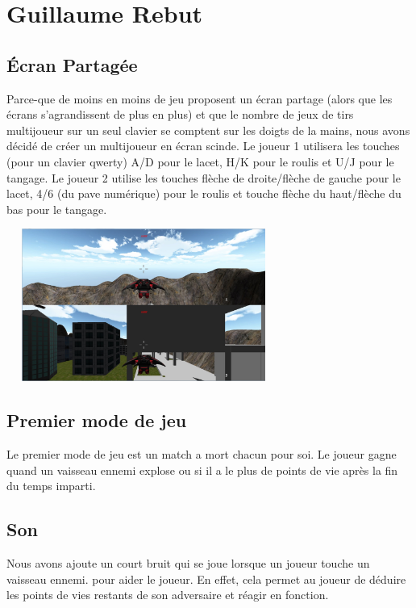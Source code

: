 \documentclass[10pt, titlepage]{report}
\begin{document}
\section{Guillaume Rebut}

\subsection{Écran Partagée} 
 Parce-que de moins en moins de jeu proposent un écran partage (alors que les écrans s'agrandissent de plus en plus) et que le nombre de jeux de tirs multijoueur sur un seul clavier se comptent sur les doigts de la mains, nous avons décidé de créer un multijoueur en écran scinde.
Le joueur 1 utilisera les touches (pour un clavier qwerty) A/D pour le lacet, H/K pour le roulis et U/J pour le tangage. Le joueur 2 utilise les touches flèche de droite/flèche de gauche pour le lacet, 4/6 (du pave numérique) pour le roulis et touche flèche du haut/flèche du bas pour le tangage. \\

\begin{center}
\includegraphics[height=5cm, width=9cm]{split.jpg}
\end{center}

\subsection{Premier mode de jeu} Le premier mode de jeu est un match a mort chacun pour soi. Le joueur gagne quand un vaisseau ennemi explose ou si il a le plus de points de vie après la fin du temps imparti.\\
 
\subsection{Son} 
 Nous avons ajoute un court bruit qui se joue lorsque un joueur touche un vaisseau ennemi. pour aider le joueur. En effet, cela permet au joueur de déduire les points de vies restants de son adversaire et réagir en fonction.\\
\end{document}
